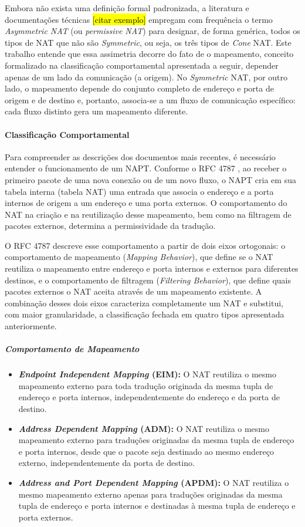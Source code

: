 Embora não exista uma definição formal padronizada, a literatura e documentações técnicas \hl{[citar exemplo]} empregam com frequência o termo \textit{Asymmetric NAT} (ou \textit{permissive NAT}) para designar, de forma genérica, todos os tipos de NAT que não são \textit{Symmetric}, ou seja, os três tipos de \textit{Cone} NAT. Este trabalho entende que essa assimetria decorre do fato de o mapeamento, conceito formalizado na classificação comportamental apresentada a seguir, depender apenas de um lado da comunicação (a origem). No \textit{Symmetric} NAT, por outro lado, o mapeamento depende do conjunto completo de endereço e porta de origem e de destino e, portanto, associa-se a um fluxo de comunicação específico: cada fluxo distinto gera um mapeamento diferente.

\paragraph{Classificação Comportamental}

Para compreender as descrições dos documentos mais recentes, é necessário entender o funcionamento de um NAPT. Conforme o RFC 4787 \citep{RFC4787}, ao receber o primeiro pacote de uma nova conexão ou de um novo fluxo, o NAPT cria em sua tabela interna (tabela NAT) uma entrada que associa o endereço e a porta internos de origem a um endereço e uma porta externos. O comportamento do NAT na criação e na reutilização desse mapeamento, bem como na filtragem de pacotes externos, determina a permissividade da tradução.

O RFC 4787 descreve esse comportamento a partir de dois eixos ortogonais: o comportamento de mapeamento (\textit{Mapping Behavior}), que define se o NAT reutiliza o mapeamento entre endereço e porta internos e externos para diferentes destinos, e o comportamento de filtragem (\textit{Filtering Behavior}), que define quais pacotes externos o NAT aceita através de um mapeamento existente. A combinação desses dois eixos caracteriza completamente um NAT e substitui, com maior granularidade, a classificação fechada em quatro tipos apresentada anteriormente.

\subparagraph{Comportamento de Mapeamento}

\begin{itemize}
    \item \textbf{\textit{Endpoint Independent Mapping} (EIM):} O NAT reutiliza o mesmo mapeamento externo para toda tradução originada da mesma tupla de endereço e porta internos, independentemente do endereço e da porta de destino.
    \item \textbf{\textit{Address Dependent Mapping} (ADM):} O NAT reutiliza o mesmo mapeamento externo para traduções originadas da mesma tupla de endereço e porta internos, desde que o pacote seja destinado ao mesmo endereço externo, independentemente da porta de destino.
    \item \textbf{\textit{Address and Port Dependent Mapping} (APDM):} O NAT reutiliza o mesmo mapeamento externo apenas para traduções originadas da mesma tupla de endereço e porta internos e destinadas à mesma tupla de endereço e porta externos.
\end{itemize}

